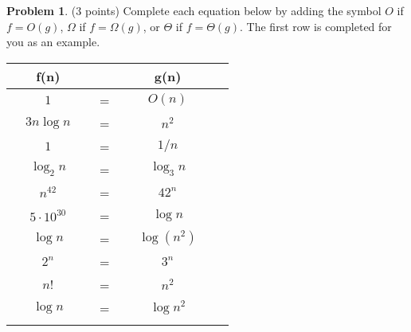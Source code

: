 \documentclass[10pt]{article}
\theoremstyle{definition}
\newtheorem{problem}{Problem}
\begin{document}
\newpage
\begin{problem}
(3 points)
    Complete each equation below by adding the symbol $O$ if $f=O(g)$, $\Omega$ if $f=\Omega(g)$, or $\Theta$ if $f=\Theta(g)$.  
    The first row is completed for you as an example.

{\renewcommand{\arraystretch}{4.4}
\begin{tabular}{c c c c c c}
    & f(n) &~\hspace{0.5in}~$ $~\hspace{0.5in}~& g(n) &\\
    \hline
    & $1$ & ~\hspace{0.5in}~$=$~\hspace{0.5in}~  & $O(n)$ &  &\\
    \arrayrulecolor{gray}\hline
    & $3 n\log n$ & ~\hspace{0.5in}~$=$~\hspace{0.5in}~  & $n^2$ &  &\\
    \arrayrulecolor{gray}\hline
    & $1$ & ~\hspace{0.5in}~$=$~\hspace{0.5in}~  & $1/n$ &  &\\
    \arrayrulecolor{gray}\hline
    & $\log_2 n$ & ~\hspace{0.5in}~$=$~\hspace{0.5in}~  & $\log_3 n$ &  &\\
    \arrayrulecolor{gray}\hline
    & $n^{42}$ & ~\hspace{0.5in}~$=$~\hspace{0.5in}~  & $42^n$ &  &\\
    \arrayrulecolor{gray}\hline
    & $5\cdot10^{30}$ & ~\hspace{0.5in}~$=$~\hspace{0.5in}~  & $\log n$ &  &\\
    \arrayrulecolor{gray}\hline
    & $\log n$ & ~\hspace{0.5in}~$=$~\hspace{0.5in}~  & $\log (n^2)$ &  &\\
    \arrayrulecolor{gray}\hline
    & $2^n$ & ~\hspace{0.5in}~$=$~\hspace{0.5in}~  & $3^n$ &  &\\
    \arrayrulecolor{gray}\hline
    & $n!$ & ~\hspace{0.5in}~$=$~\hspace{0.5in}~  & $n^2$ &  &\\
    \arrayrulecolor{gray}\hline
    & $\log n$ & ~\hspace{0.5in}~$=$~\hspace{0.5in}~  & $\log n^2$ &  &\\
    \arrayrulecolor{gray}\hline


\end{tabular}}
\end{problem}
\end{document}
